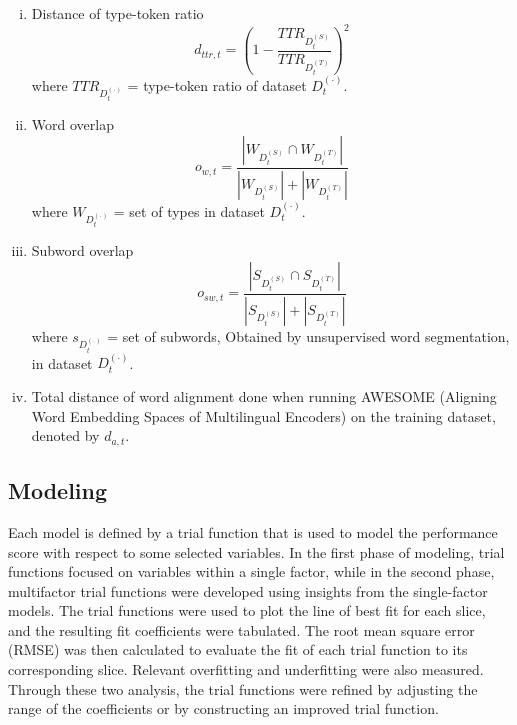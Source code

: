 \documentclass[11pt]{article}
\begin{document}
\begin{enumerate}[(a)]
\begin{enumerate}[(i)]
        \item Distance of type-token ratio
        \begin{equation*}
            d_{ttr,t} = \left( 1 - \frac{TTR_{D_t^{(S)}}}{TTR_{D_t^{(T)}}}\right)^2
        \end{equation*}
        where $TTR_{D_t^{(\cdot)}}$ = type-token ratio of dataset $D_t^{(\cdot)}$.

        \item Word overlap
        \begin{equation*}
            o_{w,t} = \frac{|W_{D_t^{(S)}} \cap W_{D_t^{(T)}}|}{|W_{D_t^{(S)}}| + |W_{D_t^{(T)}}|}
        \end{equation*}
        where $W_{D_t^{(\cdot)}}$ = set of types in dataset $D_t^{(\cdot)}$.

        \item Subword overlap
        \begin{equation*}
            o_{sw,t} = \frac{|S_{D_t^{(S)}} \cap S_{D_t^{(T)}}|}{|S_{D_t^{(S)}}| + |S_{D_t^{(T)}}|}
        \end{equation*}
        where $s_{D_t^{(\cdot)}}$ = set of subwords, Obtained by unsupervised word segmentation, in dataset $D_t^{(\cdot)}$.

        \item Total distance of word alignment done when running AWESOME (Aligning Word Embedding Spaces of Multilingual Encoders) on the training dataset, denoted by $d_{a,t}$.
    \end{enumerate}
    
\end{enumerate}

\subsection{Modeling}

Each model is defined by a trial function that is used to model the performance score with respect to some selected variables. In the first phase of modeling, trial functions focused on variables within a single factor, while in the second phase, multifactor trial functions were developed using insights from the single-factor models.
The trial functions were used to plot the line of best fit for each slice, and the resulting fit coefficients were tabulated. The root mean square error (RMSE) was then calculated to evaluate the fit of each trial function to its corresponding slice. Relevant overfitting and underfitting were also measured. Through these two analysis, the trial functions were refined by adjusting the range of the coefficients or by constructing an improved trial function.
\end{document}

